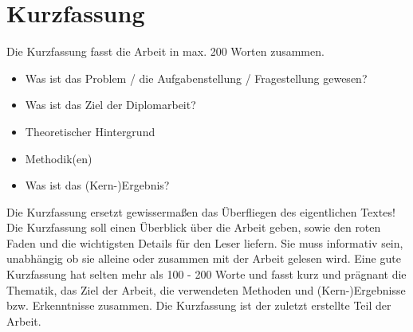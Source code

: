 \chapter*{Kurzfassung}


\color{red} 
Die Kurzfassung fasst die Arbeit in max. 200 Worten zusammen. 
\begin{itemize}
 \item Was ist das Problem / die Aufgabenstellung / Fragestellung gewesen?
 \item Was ist das Ziel der Diplomarbeit?
 \item Theoretischer Hintergrund
 \item Methodik(en)
 \item Was ist das (Kern-)Ergebnis?
\end{itemize}
Die Kurzfassung ersetzt gewisserma{\ss}en das \"Uberfliegen des eigentlichen Textes!
Die Kurzfassung soll einen \"Uberblick \"uber die Arbeit geben, sowie den \glqq{}roten Faden\grqq{} und die wichtigsten Details f\"ur den Leser liefern. Sie muss informativ sein, unabh\"angig ob sie alleine oder zusammen mit der Arbeit gelesen wird.
Eine gute Kurzfassung hat selten mehr als 100 - 200 Worte und fasst kurz und pr\"agnant die Thematik, das Ziel der Arbeit, die verwendeten Methoden und (Kern-)Ergebnisse bzw. Erkenntnisse zusammen. Die Kurzfassung ist der zuletzt erstellte Teil der Arbeit.

\color{black} 
